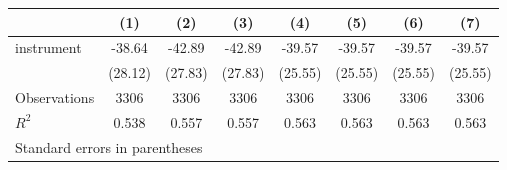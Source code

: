 \begin{tabular}{l*{7}{c}}
\toprule
                &\multicolumn{1}{c}{(1)}&\multicolumn{1}{c}{(2)}&\multicolumn{1}{c}{(3)}&\multicolumn{1}{c}{(4)}&\multicolumn{1}{c}{(5)}&\multicolumn{1}{c}{(6)}&\multicolumn{1}{c}{(7)}\\
\midrule
instrument      &   -38.64&   -42.89&   -42.89&   -39.57&   -39.57&   -39.57&   -39.57\\
                &  (28.12)&  (27.83)&  (27.83)&  (25.55)&  (25.55)&  (25.55)&  (25.55)\\
\midrule
Observations    &     3306&     3306&     3306&     3306&     3306&     3306&     3306\\
\(R^{2}\)       &    0.538&    0.557&    0.557&    0.563&    0.563&    0.563&    0.563\\
\bottomrule
\multicolumn{8}{l}{\footnotesize Standard errors in parentheses}\\
\end{tabular}
